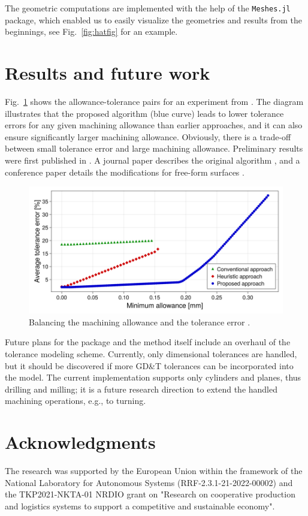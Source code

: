 \documentclass{juliacon}
\begin{document}
The geometric computations are implemented with the help of the \texttt{Meshes.jl} package, which enabled us to easily visualize the geometries and results from the beginnings, see Fig.~\ref{fig:hatfig} for an example.

\section{Results and future work}
\label{sec:results}

Fig.~\ref{fig:pareto} shows the allowance-tolerance pairs for an experiment from \cite{cserteg:2023_Annals}.
The diagram illustrates that the proposed algorithm (blue curve) leads to lower tolerance errors for any given machining allowance than earlier approaches, and it can also ensure significantly larger machining allowance.
Obviously, there is a trade-off between small tolerance error and large machining allowance.
Preliminary results were first published in \cite{cserteg:2023_DigitalTwinAssisted}.
A journal paper describes the original algorithm \cite{cserteg:2023_Annals}, and a conference paper details the modifications for free-form surfaces \cite{cserteg:2023_CMS}.

\begin{figure}[t]
	\centerline{\includegraphics[width=0.95\columnwidth]{pareto-new-label.png}}
	\caption{Balancing the machining allowance and the tolerance error \cite{cserteg:2023_Annals}.}
	\label{fig:pareto}
\end{figure}

Future plans for the package and the method itself include an overhaul of the tolerance modeling scheme.
Currently, only dimensional tolerances are handled, but it should be discovered if more GD\&T tolerances can be incorporated into the model.
The current implementation supports only cylinders and planes, thus drilling and milling; it is a future research direction to extend the handled machining operations, e.g., to turning.

\section{Acknowledgments}
The research was supported by the European Union within the framework of the National Laboratory for Autonomous Systems (RRF-2.3.1-21-2022-00002) and the TKP2021-NKTA-01  NRDIO grant on "Research on cooperative production and logistics systems to support a competitive and sustainable economy".


\end{document}

